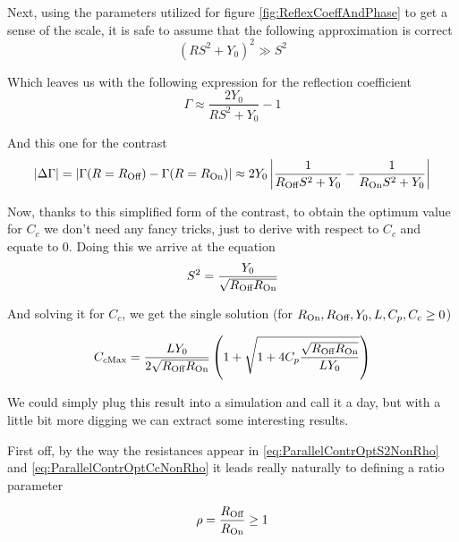 \documentclass[../main.tex]{subfiles}
\begin{document}
Next, using the parameters utilized for figure \ref{fig:ReflexCoeffAndPhase}
to get a sense of the scale, it is safe to assume that the following
approximation is correct
\begin{equation}
\label{eq:ParallelContrAprox}
    (RS^2 + Y_{0})^2 \gg S^2
\end{equation}

Which leaves us with the following expression for the reflection coefficient
\begin{equation*}
\label{eq:ApproxReflecCoeff}
    \Gamma \approx \frac{2Y_{0}}{RS^2 + Y_{0}} - 1
\end{equation*}

And this one for the contrast
\begin{equation*}
\label{eq:ParallelContr}
    |\Delta\Gamma| = |\Gamma(R=R_{\text{Off}}) - \Gamma(R=R_{\text{On}})|
                   \approx 2Y_{0}\left|\frac{1}{
                   R_{\text{Off}} S^2 + Y_{0}} - \frac{1}{R_{\text{On}} S^2 + Y_{0}
               }\right|
\end{equation*}

Now, thanks to this simplified form of the contrast, to obtain the optimum
value for \(C_{c}\) we don't need any fancy tricks, just to derive with respect
to \(C_{c}\) and equate to \(0\). Doing this we arrive at the equation
\begin{equation}
\label{eq:ParallelContrOptS2NonRho}
    S^2 = \frac{Y_{0}}{\sqrt{R_{\text{Off}}R_{\text{On}}}}
\end{equation}

And solving it for \(C_{c}\), we get the single solution
(for \(R_{\text{On}}, R_{\text{Off}}, Y_{0}, L, C_{p}, C_{c} \geq 0\))

\begin{equation}
\label{eq:ParallelContrOptCcNonRho}
C_{c\text{Max}} = \frac{L Y_{0}}{2\sqrt{R_{\text{Off}}R_{\text{On}}}}
\left(1 + \sqrt{1 + 4C_{p}\frac{\sqrt{R_{\text{Off}}R_{\text{On}}}}{LY_{0}}}\right)
\end{equation}

We could simply plug this result into a simulation and call it a day, but with
a little bit more digging we can extract some interesting results.

First off, by the way the resistances appear in \ref{eq:ParallelContrOptS2NonRho}
and \ref{eq:ParallelContrOptCcNonRho} it leads really naturally to defining
a ratio parameter

\begin{equation*}
\label{eq:RhoDef}
    \rho = \frac{R_{\text{Off}}}{R_{\text{On}}} \geq 1
\end{equation*}
\end{document}
